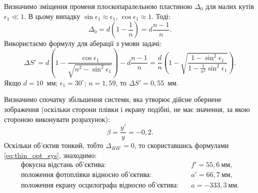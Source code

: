 \begin{solutionexample}
	Визначимо зміщення променя плоскопаралельною пластиною $\Delta_0$ для малих кутів $\epsilon_1 \ll 1$. В цьому випадку $\sin\epsilon_1 \approx \epsilon_1$, $\cos\epsilon_1 \approx 1$. Тоді:
	\begin{equation*}
		\Delta_0 = d\left(1 - \frac1n \right) = d \frac{n - 1}{n}.
	\end{equation*}
	Використаємо формулу для аберації з умови задачі:
	\begin{equation*}
		\Delta S' = d\left(1 - \frac{\cos\epsilon_1}{\sqrt{n^2 - \sin^2\epsilon_1}}\right)  - d \frac{n - 1}{n} = \frac{d}{n} \left( 1 - \sqrt{\frac{1 - \sin^2\epsilon_1}{1 - \frac{1}{n^2}\sin^2\epsilon_1}}\right).
	\end{equation*}
	Якщо $d = 10$~мм; $\epsilon_1 = 30^\circ$; $n = 1,59$, то $\Delta S' = 0,55$~мм.
\end{solutionexample}

\begin{solutionexample}
	Визначимо спочатку збільшення системи, яка утворює дійсне
	обернене зображення (оскільки сторони плівки і екрану подібні, не має
	значення, за якою стороною виконувати розрахунок):
	\begin{equation*}
		\beta = \frac{y'}{y} = -0,2.
	\end{equation*}
	Оскільки об’єктив тонкий, тобто $\Delta_{HH'} = 0 $, то скориставшись формулами \eqref{eq:thin_opt_sys}, знаходимо:
	\begin{align*}
		\text{фокусна відстань об'єктива:}                      & \quad f' = 55,6\ \text{мм},  \\
		\text{положення фотоплівки відносно об’єктива:}         & \quad a' = 66,7\ \text{мм},  \\
		\text{положення екрану осцилографа відносно об’єктива:} & \quad a = -333,3\ \text{мм}.
	\end{align*}
\end{solutionexample}


